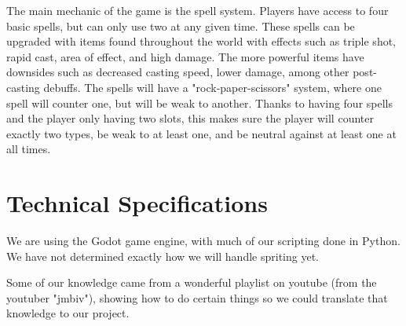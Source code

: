 \documentclass{sigchi}
\begin{document}
The main mechanic of the game is the spell system.  Players have access to four basic spells, but can only use two at any given time.  
These spells can be upgraded with items found throughout the world with effects such as triple shot, rapid cast, area of effect, and high 
damage.  The more powerful items have downsides such as decreased casting speed, lower damage, among other post-casting debuffs.  The spells
will have a "rock-paper-scissors" system, where one spell will counter one, but will be weak to another.  Thanks to having four spells and
the player only having two slots, this makes sure the player will counter exactly two types, be weak to at least one, and be neutral against
at least one at all times.

\section{Technical Specifications}

We are using the Godot game engine\cite{godot}, with much of our scripting done in Python.  We have not determined exactly how we will handle spriting yet.

Some of our knowledge came from a wonderful playlist on youtube (from the youtuber "jmbiv"\cite{jmbiv}), showing how to do certain things so we could translate that knowledge to our project.



\end{document}
